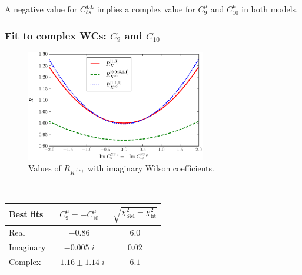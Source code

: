 \documentclass[mathserif, 10pt, dvipsnames]{beamer}
\begin{document}
\begin{frame}
\vspace{0.5cm}

A negative value for $C_{bs}^{LL}$ implies a complex value for $C_9^\mu$ and $C_{10}^\mu$ in both models.

\end{frame}

\begin{frame}\frametitle{Fit to complex WCs: $C_9$ and $C_{10}$}

            \begin{figure}
                \centering
\includegraphics[width=0.7\textwidth]{figures/RK_im.pdf}\\
                Values of $R_{K^{(*)}}$ with imaginary Wilson coefficients.
            \end{figure}


    ~

    \begin{table}
        \centering
        \begin{tabular}{|l|c|c|}\hline
            \textbf{Best fits} & $C_9^\mu=-C_{10}^\mu$ & $\sqrt{\chi^2_\mathrm{SM} - \chi^2_\mathrm{fit}}$ \\\hline
            Real               & $ -0.86$              & $6.0 $                                            \\\hline
            Imaginary          & $-0.005\;i $          & $0.02 $                                           \\\hline
            Complex            & $-1.16\pm 1.14\;i$    & $6.1$                                             \\\hline
        \end{tabular}
    \end{table}
\end{frame}
\end{document}
